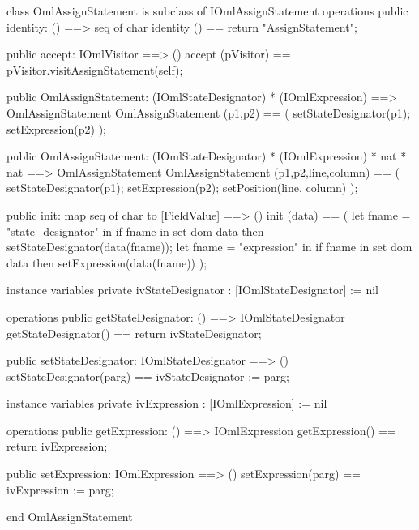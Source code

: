 \begin{vdm_al}
class OmlAssignStatement is subclass of IOmlAssignStatement
operations
  public identity: () ==> seq of char
  identity () == return "AssignStatement";

  public accept: IOmlVisitor ==> ()
  accept (pVisitor) == pVisitor.visitAssignStatement(self);

  public OmlAssignStatement:
    (IOmlStateDesignator) *
    (IOmlExpression) ==> OmlAssignStatement
  OmlAssignStatement (p1,p2) == 
    ( setStateDesignator(p1);
      setExpression(p2) );

  public OmlAssignStatement:
    (IOmlStateDesignator) *
    (IOmlExpression) *
    nat *
    nat ==> OmlAssignStatement
  OmlAssignStatement (p1,p2,line,column) == 
    ( setStateDesignator(p1);
      setExpression(p2);
      setPosition(line, column) );

  public init: map seq of char to [FieldValue] ==> ()
  init (data) ==
    ( let fname = "state_designator" in
        if fname in set dom data
        then setStateDesignator(data(fname));
      let fname = "expression" in
        if fname in set dom data
        then setExpression(data(fname)) );

instance variables
  private ivStateDesignator : [IOmlStateDesignator] := nil

operations
  public getStateDesignator: () ==> IOmlStateDesignator
  getStateDesignator() == return ivStateDesignator;

  public setStateDesignator: IOmlStateDesignator ==> ()
  setStateDesignator(parg) == ivStateDesignator := parg;

instance variables
  private ivExpression : [IOmlExpression] := nil

operations
  public getExpression: () ==> IOmlExpression
  getExpression() == return ivExpression;

  public setExpression: IOmlExpression ==> ()
  setExpression(parg) == ivExpression := parg;

end OmlAssignStatement
\end{vdm_al}


